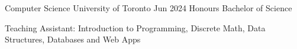 
\begin{cventries}
  \cventry
    {Computer Science}
    {University of Toronto}
    {}
    {Jun 2024}
    {Honours Bachelor of Science}
    {
      \begin{cvitems}
        \item {Teaching Assistant: Introduction to Programming, Discrete Math, Data Structures, Databases and Web Apps}
      \end{cvitems}
    }
\end{cventries}

